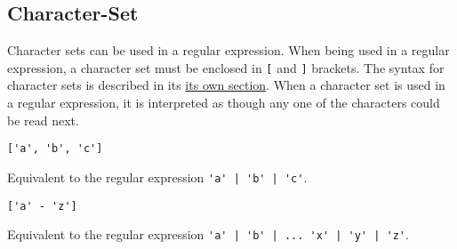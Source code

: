 
\subsection{Character-Set}
{
	Character sets can be used in a regular expression.
	When being used in a regular expression, a character set must be enclosed in
	\texttt{[} and \texttt{]} brackets.
	The syntax for character sets is described in its
	\hyperref[sec:charset]{its own section}.
	When a character set is used in a regular expression,
	it is interpreted as though any one of the characters could be read
	next.
	
	\begin{itemize}
	{
		\item[] \lstinline[language=MAIA, columns=fixed]@['a', 'b', 'c']@
		
			Equivalent to the regular expression \lstinline[language=MAIA, columns=fixed]@'a' | 'b' | 'c'@.
		
		\item[] \lstinline[language=MAIA, columns=fixed]@['a' - 'z']@
		
			Equivalent to the regular
			expression \lstinline[language=MAIA, columns=fixed]@'a' | 'b' | ... 'x' | 'y' | 'z'@.
	}
	\end{itemize}
	
}
